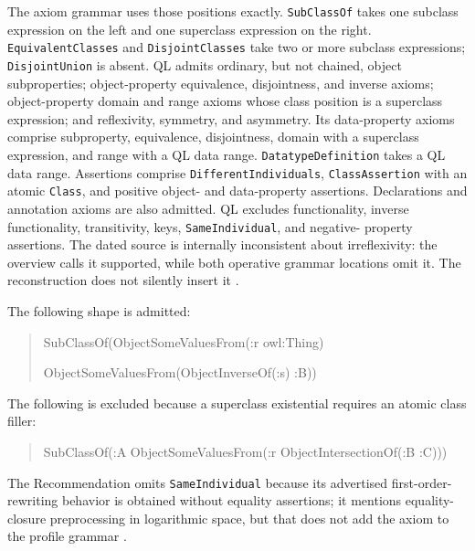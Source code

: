 The axiom grammar uses those positions exactly.  \texttt{SubClassOf} takes one
subclass expression on the left and one superclass expression on the right.
\texttt{EquivalentClasses} and \texttt{DisjointClasses} take two or more
subclass expressions; \texttt{DisjointUnion} is absent.  QL admits ordinary,
but not chained, object subproperties; object-property equivalence,
disjointness, and inverse axioms; object-property domain and range axioms whose
class position is a superclass expression; and reflexivity, symmetry, and
asymmetry.  Its data-property axioms comprise subproperty, equivalence,
disjointness, domain with a superclass expression, and range with a QL data
range.  \texttt{DatatypeDefinition} takes a QL data range.  Assertions comprise
\texttt{DifferentIndividuals}, \texttt{ClassAssertion} with an atomic
\texttt{Class}, and positive object- and data-property assertions.  Declarations
and annotation axioms are also admitted.  QL excludes functionality, inverse
functionality, transitivity, keys, \texttt{SameIndividual}, and negative-
property assertions.  The dated source is internally inconsistent about
irreflexivity: the overview calls it supported, while both operative grammar
locations omit it.  The reconstruction does not silently insert it
\cite[\S\S3.1--3.2 and app.~6.2]{W3COWL2Profiles2012}.

The following shape is admitted:
\begin{quote}\small\ttfamily
SubClassOf(ObjectSomeValuesFrom(:r owl:Thing)\par
\hspace*{2em}ObjectSomeValuesFrom(ObjectInverseOf(:s) :B))
\end{quote}
The following is excluded because a superclass existential requires an atomic
class filler:
\begin{quote}\small\ttfamily
SubClassOf(:A ObjectSomeValuesFrom(:r ObjectIntersectionOf(:B :C)))
\end{quote}
The Recommendation omits \texttt{SameIndividual} because its advertised
first-order-rewriting behavior is obtained without equality assertions; it
mentions equality-closure preprocessing in logarithmic space, but that does
not add the axiom to the profile grammar
\cite[\S\S3.1 and~3.2.3]{W3COWL2Profiles2012}.

